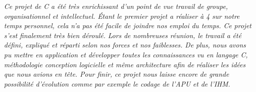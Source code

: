 \emph{  Ce projet de C a été très enrichissant d'un point de vue travail de groupe, organisationnel et intellectuel. Étant le premier projet a réaliser à 4 sur notre temps personnel, cela n'a pas été facile de joindre nos emploi du temps. Ce projet s'est finalement très bien déroulé. Lors de nombreuses réunion, le travail a été défini, expliqué et réparti selon nos forces et nos faiblesses. De plus, nous avons pu mettre en application et développer toutes les connaissances vu en langage C, méthodologie conception logicielle et même architecture afin de réaliser les idées que nous avions en tête. Pour finir, ce projet nous laisse encore de grande possibilité d'évolution comme par exemple le codage de l'APU et de l'IHM.}
